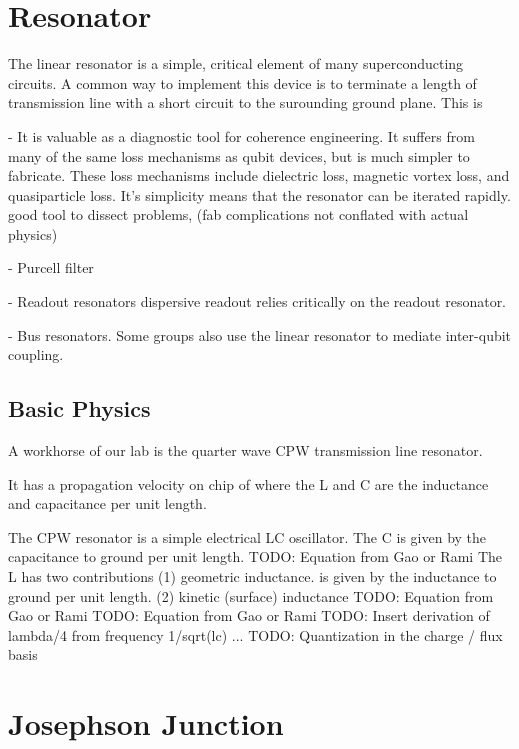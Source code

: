 \section{Resonator}
The linear resonator is a simple, critical element of many superconducting circuits.
A common way to implement this device is to terminate a length of transmission line with a short circuit to the surounding ground plane.
This is

- It is valuable as a diagnostic tool for coherence engineering.
It suffers from many of the same loss mechanisms as qubit devices, but is much simpler to fabricate.
These loss mechanisms include dielectric loss, magnetic vortex loss, and quasiparticle loss.
It's simplicity means that the resonator can be iterated rapidly.
good tool to dissect problems, (fab complications not conflated with actual physics)

- Purcell filter

- Readout resonators
dispersive readout relies critically on the readout resonator.

- Bus resonators.
Some groups also use the linear resonator to mediate inter-qubit coupling.

\subsection{Basic Physics}
A workhorse of our lab is the quarter wave CPW transmission line resonator.

It has a propagation velocity on chip of
 where the L and C are the inductance and capacitance per unit length.

The CPW resonator is a simple electrical LC oscillator.
The C is given by the capacitance to ground per unit length.
TODO:  Equation from Gao or Rami
The L has two contributions
(1) geometric inductance.  is given by the inductance to ground per unit length.
(2) kinetic (surface) inductance
TODO:  Equation from Gao or Rami
TODO:  Equation from Gao or Rami
TODO:  Insert derivation of lambda/4 from frequency 1/sqrt(lc) ...
TODO:  Quantization in the charge / flux basis

\section{Josephson Junction}

